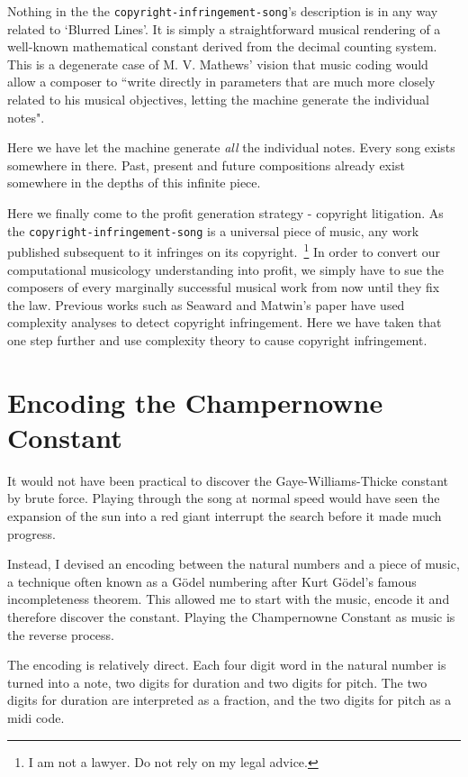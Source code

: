 \documentclass[numbers]{sigplanconf}
\begin{document}
Nothing in the the \verb|copyright-infringement-song|'s description is in any way related to `Blurred Lines'.
It is simply a straightforward musical rendering of a well-known mathematical constant derived from the decimal counting
system. This is a degenerate case of M. V. Mathews' vision that music coding would allow a composer to
``write directly in parameters that are much more
closely related to his musical objectives, letting the machine generate the individual
notes"\cite{The Digital Computer as a Musical Instrument}.

Here we have let the machine generate \textit{all} the individual notes. Every song exists somewhere in there. Past, present and
future compositions already exist somewhere in the depths of this infinite piece.

Here we finally come to the profit generation strategy - copyright litigation. As the \verb|copyright-infringement-song| is
a universal piece of music, any work published subsequent to it infringes on its copyright.~\footnote{I am not a lawyer. Do not rely on my legal advice.} In order to convert our computational musicology understanding into profit, we simply have to
sue the composers of every marginally successful musical work from now until they fix the law. Previous works such as Seaward
and Matwin's paper have used complexity analyses to detect copyright infringement\cite{Intrinsic Plaguerism Detection}.
Here we have taken that one step further and use complexity theory to cause copyright infringement.

\section{Encoding the Champernowne Constant}

It would not have been practical to discover the Gaye-Williams-Thicke constant by brute force. Playing through the song at normal
speed would have seen the expansion of the sun into a red giant interrupt the search before it made much progress.

Instead, I devised an encoding between the natural numbers and a piece of music, a technique often known as a G{\"o}del numbering
after Kurt G{\"o}del's famous incompleteness theorem. This allowed me to start with the music, encode it and therefore discover the
constant. Playing the Champernowne Constant as music is the reverse process.

The encoding is relatively direct. Each four digit word in the natural number is turned into a note, two digits for duration and
two digits for pitch. The two digits for duration are interpreted as a fraction, and the two digits for pitch as a midi code.
\end{document}
